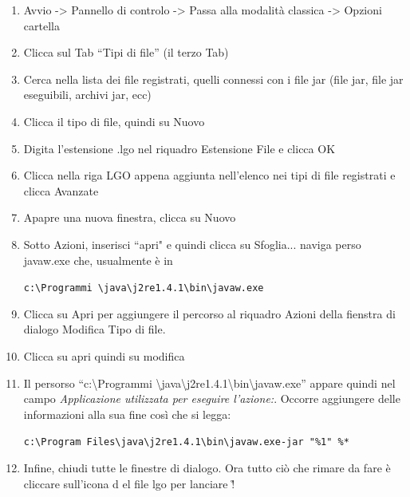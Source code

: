 \begin{enumerate}
\item Avvio -> Pannello di controlo -> Passa alla modalità classica  -> Opzioni cartella
\item Clicca sul Tab ``Tipi di file'' (il terzo Tab)
\item Cerca nella lista dei file registrati, quelli connessi con i file jar (file jar, file jar eseguibili, archivi jar, ecc)
\item Clicca il tipo di file, quindi su Nuovo
\item Digita l'estensione .lgo nel riquadro Estensione File e clicca OK
\item Clicca nella riga LGO appena aggiunta nell'elenco nei tipi di file registrati e clicca Avanzate
\item Apapre una nuova finestra, clicca su Nuovo
\item Sotto Azioni, inserisci ``apri" e quindi clicca su Sfoglia... naviga perso javaw.exe che, usualmente è in
\begin{center}
\texttt{c:\textbackslash{}Programmi \textbackslash{}java\textbackslash{}j2re1.4.1\textbackslash{}bin\textbackslash{}javaw.exe}
\end{center}
\item Clicca su Apri per aggiungere il percorso al riquadro Azioni della fienstra di dialogo Modifica Tipo di file.
\item Clicca su apri quindi su modifica
\item Il persorso {}``c:\textbackslash{}Programmi \textbackslash{}java\textbackslash{}j2re1.4.1\textbackslash{}bin\textbackslash{}javaw.exe'' appare quindi nel campo \textit{Applicazione utilizzata per eseguire l'azione:}. Occorre aggiungere delle informazioni alla sua fine così che si legga:
\begin{center}
\texttt{\textquotedbl c:\textbackslash{}Program Files\textbackslash{}java\textbackslash{}j2re1.4.1\textbackslash{}bin\textbackslash{}javaw.exe\textquotedbl  -jar {}"\%1" \%{*}}
\end{center}
\item Infine, chiudi tutte le finestre di dialogo. Ora tutto ciò che rimare da fare è cliccare sull'icona d el file lgo per lanciare \xlogo\r!
\end{enumerate}

